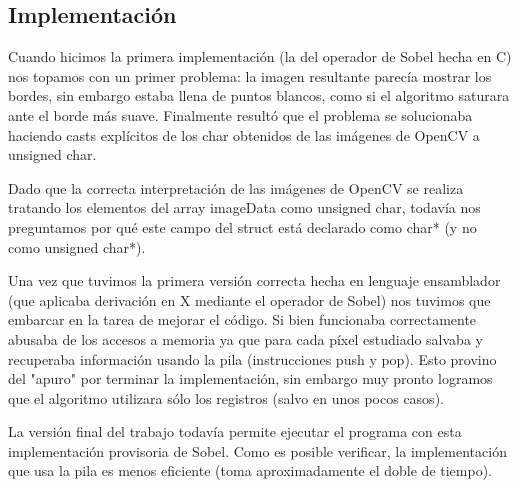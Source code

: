 \subsection{Implementación}

Cuando hicimos la primera implementación (la del operador de Sobel hecha en C) nos topamos con un primer problema: la imagen resultante parecía mostrar los bordes, sin embargo estaba llena de puntos blancos, como si el algoritmo saturara ante el borde más suave. Finalmente resultó que el problema se solucionaba haciendo casts explícitos de los char obtenidos de las imágenes de OpenCV a unsigned char.

Dado que la correcta interpretación de las imágenes de OpenCV se realiza tratando los elementos del array imageData como unsigned char, todavía nos preguntamos por qué este campo del struct está declarado como char* (y no como unsigned char*).

%
%

Una vez que tuvimos la primera versión correcta hecha en lenguaje ensamblador (que aplicaba derivación en X mediante el operador de Sobel) nos tuvimos que embarcar en la tarea de mejorar el código. Si bien funcionaba correctamente abusaba de los accesos a memoria ya que para cada píxel estudiado salvaba y recuperaba información usando la pila (instrucciones push y pop). Esto provino del "apuro" por terminar la implementación, sin embargo muy pronto logramos que el algoritmo utilizara sólo los registros (salvo en unos pocos casos).

La versión final del trabajo todavía permite ejecutar el programa con esta implementación provisoria de Sobel. Como es posible verificar, la implementación que usa la pila es menos eficiente (toma aproximadamente el doble de tiempo).
